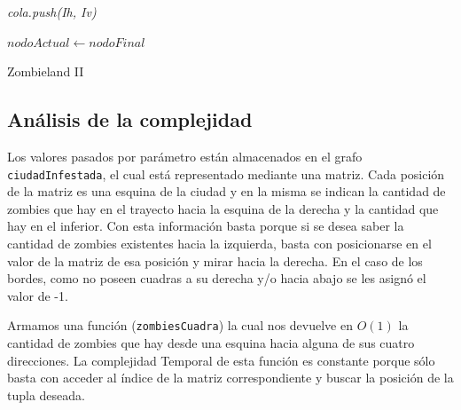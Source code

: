 \IncMargin{1em}
\begin{algorithm}
\BlankLine
\BlankLine
\emph{cola.push(Ih, Iv)}\;

	\emph{$nodoActual \leftarrow nodoFinal$}\;
\;



\caption{Zombieland II}%
\end{algorithm}\DecMargin{1em}

\newpage
\subsection{An\'alisis de la complejidad}

Los valores pasados por par\'ametro est\'an almacenados en el grafo \texttt{ciudadInfestada}, el cual est\'a representado mediante una matriz. Cada posici\'on de la matriz es una esquina de la ciudad y en la misma se indican la cantidad de zombies que hay en el trayecto hacia la esquina de la derecha y la cantidad que hay en el inferior. Con esta informaci\'on basta porque si se desea saber la cantidad de zombies existentes hacia la izquierda, basta con posicionarse en el valor de la matriz de esa posici\'on y mirar hacia la derecha. En el caso de los bordes, como no poseen cuadras a su derecha y/o hacia abajo se les asign\'o el valor de -1.

Armamos una funci\'on (\texttt{zombiesCuadra}) la cual nos devuelve en $O(1)$ la cantidad de zombies que hay desde una esquina hacia alguna de sus cuatro direcciones. La complejidad Temporal de esta funci\'on es constante porque s\'olo basta con acceder al \'indice de la matriz correspondiente y buscar la posici\'on de la tupla deseada.\\
\\


